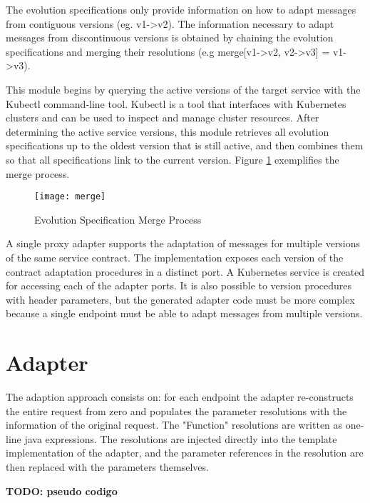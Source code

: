 The evolution specifications only provide information on how to adapt messages from contiguous versions (eg. v1->v2).
The information necessary to adapt messages from discontinuous versions is obtained by chaining the evolution specifications and
merging their resolutions (e.g merge[v1->v2, v2->v3] = v1->v3).

This module begins by querying the active versions of the target service with the Kubectl command-line tool.
Kubectl is a tool that interfaces with Kubernetes clusters and can be used to inspect and manage cluster resources.
After determining the active service versions, this module retrieves all evolution specifications up to the oldest version that is still active,
and then combines them so that all specifications link to the current version. Figure \ref{fig:merge} exemplifies the merge process.

\begin{figure}[htbp]
    \centering
    \texttt{[image: merge]}
    \caption{Evolution Specification Merge Process}
    \label{fig:merge}
\end{figure}

A single proxy adapter supports the adaptation of messages for multiple versions of the same service contract.
The implementation exposes each version of the contract adaptation procedures in a distinct port.
A Kubernetes service is created for accessing each of the adapter ports.
It is also possible to version procedures with header parameters,
but the generated adapter code must be more complex because a single endpoint must be able to adapt messages from multiple versions.

\section{Adapter} %
\label{sec:adapter}

The adaption approach consists on: for each endpoint the
adapter re-constructs the entire request from zero and populates the parameter resolutions with the information of the original request.
The "Function" resolutions are written as one-line java expressions.
The resolutions are injected directly into the template implementation of the adapter, and the parameter references in the resolution are then replaced with the parameters themselves.

\textbf{TODO: pseudo codigo}

\paragraph{}

